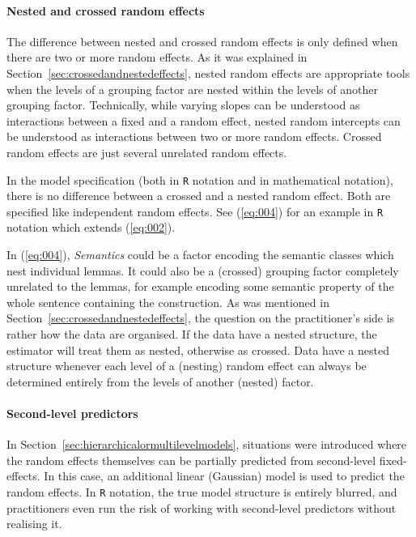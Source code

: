 \paragraph{Nested and crossed random effects}

The difference between nested and crossed random effects is only defined when there are two or more random effects.
As it was explained in Section~\ref{sec:crossedandnestedeffects}, nested random effects are appropriate tools when the levels of a grouping factor are nested within the levels of another grouping factor.
Technically, while varying slopes can be understood as interactions between a fixed and a random effect, nested random intercepts can be understood as interactions between two or more random effects.
Crossed random effects are just several unrelated random effects.

In the model specification (both in \texttt{R} notation and in mathematical notation), there is no difference between a crossed and a nested random effect.
Both are specified like independent random effects.
See (\ref{eq:004}) for an example in \texttt{R} notation which extends (\ref{eq:002}).


In (\ref{eq:004}), \textit{Semantics} could be a factor encoding the semantic classes which nest individual lemmas.
It could also be a (crossed) grouping factor completely unrelated to the lemmas, for example encoding some semantic property of the whole sentence containing the construction.
As was mentioned in Section~\ref{sec:crossedandnestedeffects}, the question on the practitioner's side is rather how the data are organised.
If the data have a nested structure, the estimator will treat them as nested, otherwise as crossed.
Data have a nested structure whenever each level of a (nesting) random effect can always be determined entirely from the levels of another (nested) factor.


\paragraph{Second-level predictors}

In Section~\ref{sec:hierarchicalormultilevelmodels}, situations were introduced where the random effects themselves can be partially predicted from second-level fixed-effects.
In this case, an additional linear (Gaussian) model is used to predict the random effects.
In \texttt{R} notation, the true model structure is entirely blurred, and practitioners even run the risk of working with second-level predictors without realising it.

